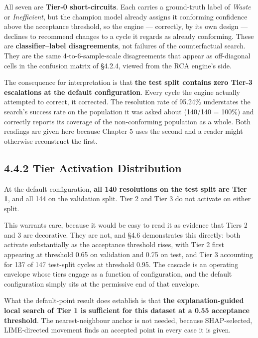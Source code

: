All seven are \textbf{Tier-0 short-circuits}. Each carries a ground-truth label of \emph{Waste} or \emph{Inefficient}, but the champion model already assigns it conforming confidence above the acceptance threshold, so the engine --- correctly, by its own design --- declines to recommend changes to a cycle it regards as already conforming. These are \textbf{classifier--label disagreements}, not failures of the counterfactual search. They are the same 4-to-6-sample-scale disagreements that appear as off-diagonal cells in the confusion matrix of §4.2.4, viewed from the RCA engine's side.

The consequence for interpretation is that \textbf{the test split contains zero Tier-3 escalations at the default configuration}. Every cycle the engine actually attempted to correct, it corrected. The resolution rate of 95.24\% understates the search's success rate on the population it was asked about (140/140 = 100\%) and correctly reports its coverage of the non-conforming population as a whole. Both readings are given here because Chapter 5 uses the second and a reader might otherwise reconstruct the first.

\hypertarget{tier-activation-distribution}{%
\subsection{4.4.2 Tier Activation Distribution}\label{tier-activation-distribution}}

At the default configuration, \textbf{all 140 resolutions on the test split are Tier 1}, and all 144 on the validation split. Tier 2 and Tier 3 do not activate on either split.

This warrants care, because it would be easy to read it as evidence that Tiers 2 and 3 are decorative. They are not, and §4.6 demonstrates this directly: both activate substantially as the acceptance threshold rises, with Tier 2 first appearing at threshold 0.65 on validation and 0.75 on test, and Tier 3 accounting for 137 of 147 test-split cycles at threshold 0.95. The cascade is an operating envelope whose tiers engage as a function of configuration, and the default configuration simply sits at the permissive end of that envelope.

What the default-point result does establish is that \textbf{the explanation-guided local search of Tier 1 is sufficient for this dataset at a 0.55 acceptance threshold}. The nearest-neighbour anchor is not needed, because SHAP-selected, LIME-directed movement finds an accepted point in every case it is given.

